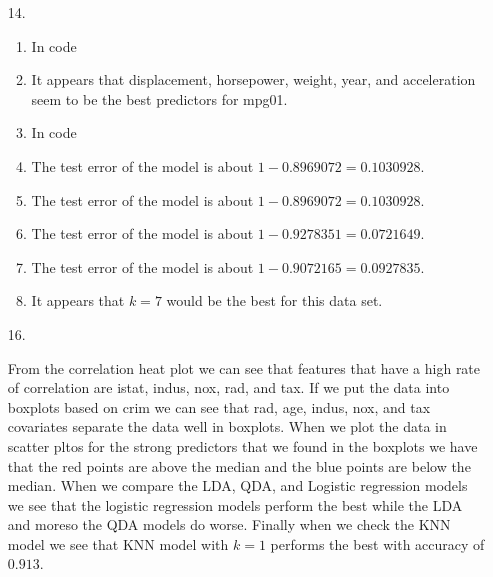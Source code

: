 \documentclass{article}
\begin{document}
\begin{enumerate}
    \item [14.]
    
    \begin{enumerate}
        \item 
        
        In code
        
        \item
        
        It appears that displacement, horsepower, weight, year, and acceleration seem to be the best predictors for mpg01.
        
        \item
        
        In code
        
        \item
        
        The test error of the model is about $1-0.8969072 = 0.1030928.$
        
        \item
        
        The test error of the model is about $1-0.8969072 = 0.1030928.$
        
        \item
        
        The test error of the model is about $1-0.9278351 = 0.0721649.$
        
        \item
        
        The test error of the model is about $1-0.9072165 = 0.0927835.$
         
        \item
         
        It appears that $k=7$ would be the best for this data set.
         
    \end{enumerate}
    
    \item [16.]
    
    From the correlation heat plot we can see that features that have a high rate of correlation are istat, indus, nox, rad, and tax. If we put the data into boxplots based on crim we can see that rad, age, indus, nox, and tax covariates separate the data well in boxplots. When we plot the data in scatter pltos for the strong predictors that we found in the boxplots we have that the red points are above the median and the blue points are below the median. When we compare the LDA, QDA, and Logistic regression models we see that the logistic regression models perform the best while the LDA and moreso the QDA models do worse. Finally when we check the KNN model we see that KNN model with $k=1$ performs the best with accuracy of $0.913$.
    
\end{enumerate}
\end{document}
